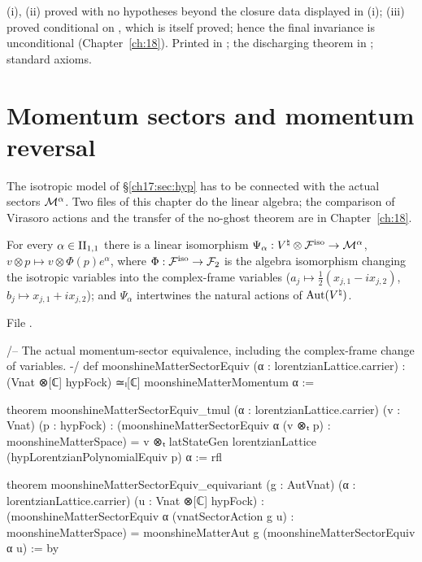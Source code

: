 \begin{status}
(i), (ii) proved with no hypotheses beyond the closure data displayed in (i); (iii) proved conditional on , which is itself proved; hence the final
invariance is unconditional (Chapter~\ref{ch:18}).  Printed in ; the
discharging theorem in ; standard axioms.
\end{status}

\section{Momentum sectors and momentum reversal}\label{ch17:sec:sector}

The isotropic model of \S\ref{ch17:sec:hyp} has to be connected with the actual sectors $\mathcal{M}^\alpha$.  Two files of this
chapter do the linear algebra; the comparison of Virasoro actions and the transfer of the no-ghost theorem are in
Chapter~\ref{ch:18}.

\begin{theorem}\label{ch17:thm:sectorequiv}
For every $\alpha\in{\mathrm{II}_{1,1}}$ there is a linear isomorphism $\Psi_\alpha:{V^{\natural}}\otimes\mathcal{F}^{\mathrm{iso}}\to\mathcal{M}^\alpha$,
$v\otimes p\mapsto v\otimes\Phi(p)e^\alpha$, where $\Phi:\mathcal{F}^{\mathrm{iso}}\to\mathcal{F}_2$ is the algebra isomorphism changing the
isotropic variables into the complex-frame variables ($a_{j}\mapsto\frac12(x_{j,1}-ix_{j,2})$,
$b_j\mapsto x_{j,1}+ix_{j,2}$); and $\Psi_\alpha$ intertwines the natural actions of $\operatorname{Aut}({V^{\natural}})$.
\end{theorem}

\noindent File .
\begin{leancode}
/-- The actual momentum-sector equivalence, including the complex-frame change of variables. -/
def moonshineMatterSectorEquiv (α : lorentzianLattice.carrier) :
    (Vnat ⊗[ℂ] hypFock) ≃ₗ[ℂ] moonshineMatterMomentum α :=

theorem moonshineMatterSectorEquiv_tmul (α : lorentzianLattice.carrier) (v : Vnat) (p : hypFock) :
    (moonshineMatterSectorEquiv α (v ⊗ₜ p) : moonshineMatterSpace) =
      v ⊗ₜ latStateGen lorentzianLattice (hypLorentzianPolynomialEquiv p) α := rfl

theorem moonshineMatterSectorEquiv_equivariant (g : AutVnat) (α : lorentzianLattice.carrier)
    (u : Vnat ⊗[ℂ] hypFock) :
    (moonshineMatterSectorEquiv α (vnatSectorAction g u) : moonshineMatterSpace) =
      moonshineMatterAut g (moonshineMatterSectorEquiv α u) := by
\end{leancode}

